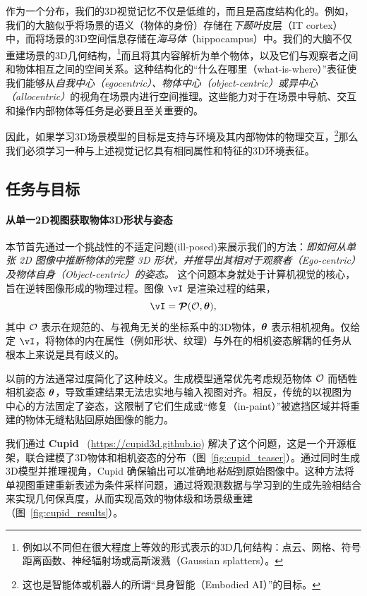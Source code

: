 \documentclass[../../book-main_zh.tex]{subfiles}
\begin{document}
作为一个分布，我们的3D视觉记忆不仅是低维的，而且是高度结构化的。例如，我们的大脑似乎将场景的语义（物体的身份）存储在{\em 下颞叶}皮层（IT cortex）中，而将场景的3D空间信息存储在{\em 海马体}（hippocampus）中。我们的大脑不仅重建场景的3D几何结构，\footnote{例如以不同但在很大程度上等效的形式表示的3D几何结构：点云、网格、符号距离函数、神经辐射场或高斯泼溅（Gaussian splatters）。}而且将其内容解析为单个物体，以及它们与观察者之间和物体相互之间的空间关系。这种结构化的“什么在哪里（what-is-where）”表征使我们能够从{\em 自我中心（egocentric）、物体中心（object-centric）或异中心（allocentric）}的视角在场景内进行空间推理。这些能力对于在场景中导航、交互和操作内部物体等任务是必要且至关重要的。

因此，如果学习3D场景模型的目标是支持与环境及其内部物体的物理交互，\footnote{这也是智能体或机器人的所谓“具身智能（Embodied AI）”的目标。}那么我们必须学习一种与上述视觉记忆具有相同属性和特征的3D环境表征。




\subsection{任务与目标}
\label{sub:cupid_objective}


\paragraph{从单一2D视图获取物体3D形状与姿态}
本节首先通过一个挑战性的不适定问题(ill-posed)来展示我们的方法：{\em 即如何从单张 2D 图像中推断物体的完整 3D 形状，并推导出其相对于观察者（Ego-centric）及物体自身（Object-centric）的姿态。} 这个问题本身就处于计算机视觉的核心，旨在逆转图像形成的物理过程。图像 $\image$ 是渲染过程的结果，
\[
\image = \render(\object, \pose),
\]
其中 $\mathcal{O}$ 表示在规范的、与视角无关的坐标系中的3D物体，$\boldsymbol{\theta}$ 表示相机视角。仅给定 $\image$，将物体的内在属性（例如形状、纹理）与外在的相机姿态解耦的任务从根本上来说是具有歧义的。


以前的方法通常过度简化了这种歧义。生成模型通常优先考虑规范物体 $\mathcal{O}$ 而牺牲相机姿态 $\boldsymbol{\theta}$，导致重建结果无法忠实地与输入视图对齐。相反，传统的以视图为中心的方法固定了姿态，这限制了它们生成或“修复（in-paint）”被遮挡区域并将重建的物体无缝粘贴回原始图像的能力。


我们通过 \textbf{Cupid}~\citep{huang2025cupid} (\url{https://cupid3d.github.io}) 解决了这个问题，这是一个开源框架，联合建模了3D物体和相机姿态的分布（图~\ref{fig:cupid_teaser}）。通过同时生成3D模型并推理视角，Cupid 确保输出可以准确地\textit{粘贴}到原始图像中。这种方法将单视图重建重新表述为条件采样问题，通过将观测数据与学习到的生成先验相结合来实现几何保真度，从而实现高效的物体级和场景级重建（图~\ref{fig:cupid_results}）。
\end{document}
